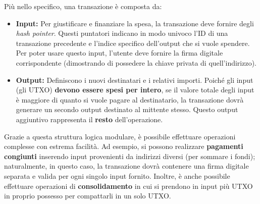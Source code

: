 Più nello specifico, una transazione è composta da:
\begin{itemize}
    \item \textbf{Input:} Per giustificare e finanziare la spesa, la transazione deve fornire degli \textit{hash pointer}. Questi puntatori indicano in modo univoco l'ID di una transazione precedente e l'indice specifico dell'output che si vuole spendere. Per poter usare questo input, l'utente deve fornire la firma digitale corrispondente (dimostrando di possedere la chiave privata di quell'indirizzo).
    \item \textbf{Output:} Definiscono i nuovi destinatari e i relativi importi. Poiché gli input (gli UTXO) \textbf{devono essere spesi per intero}, se il valore totale degli input è maggiore di quanto si vuole pagare al destinatario, la transazione dovrà generare un secondo output destinato al mittente stesso. Questo output aggiuntivo rappresenta il \textbf{resto} dell'operazione.
\end{itemize}

Grazie a questa struttura logica modulare, è possibile effettuare operazioni complesse con estrema facilità. Ad esempio, si possono realizzare \textbf{pagamenti congiunti} inserendo input provenienti da indirizzi diversi (per sommare i fondi); naturalmente, in questo caso, la transazione dovrà contenere una firma digitale separata e valida per ogni singolo input fornito. Inoltre, è anche possibile effettuare operazioni di \textbf{consolidamento} in cui si prendono in input più UTXO in proprio possesso per compattarli in un solo UTXO.

